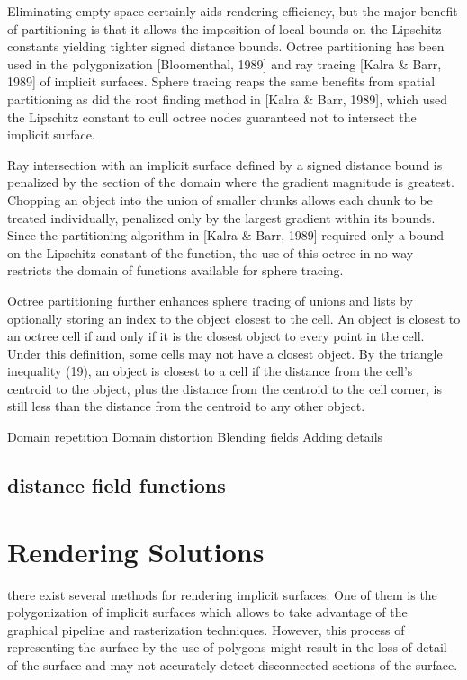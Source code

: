 Eliminating empty space certainly aids rendering efficiency, but the major benefit of partitioning is that it allows the imposition of local bounds on the Lipschitz constants yielding tighter signed distance bounds. Octree partitioning has been used in the polygonization [Bloomenthal, 1989] and ray tracing [Kalra \& Barr, 1989] of implicit surfaces. Sphere tracing reaps the same benefits from spatial partitioning as did the root finding method in [Kalra \& Barr, 1989], which used the Lipschitz constant to cull octree nodes guaranteed not to intersect the implicit surface.

Ray intersection with an implicit surface defined by a signed distance bound is penalized by the section of the domain where the gradient magnitude is greatest. Chopping an object into the union of smaller chunks allows each chunk to be treated individually, penalized only by the largest gradient within its bounds. Since the partitioning algorithm in [Kalra \& Barr, 1989] required only a bound on the Lipschitz constant of the function, the use of this octree in no way restricts the domain of functions available for sphere tracing.

Octree partitioning further enhances sphere tracing of unions and lists by optionally storing an index to the object closest to the cell. An object is closest to an octree cell if and only if it is the closest object to every point in the cell. Under this definition, some cells may not have a closest object. By the triangle inequality (19), an object is closest to a cell if the distance from the cell’s centroid to the object, plus the distance from the centroid to the cell corner, is still less than the distance from the centroid to any other object.



Domain repetition
Domain distortion
Blending fields
Adding details

\subsection*{distance field functions}

\section{Rendering Solutions}

there exist several methods for rendering implicit surfaces. One of them is the polygonization of implicit surfaces which allows to take advantage of the graphical pipeline and rasterization techniques. However, this process of representing the surface by the use of polygons might result in the loss of detail of the surface and may not accurately detect disconnected sections of the surface.

